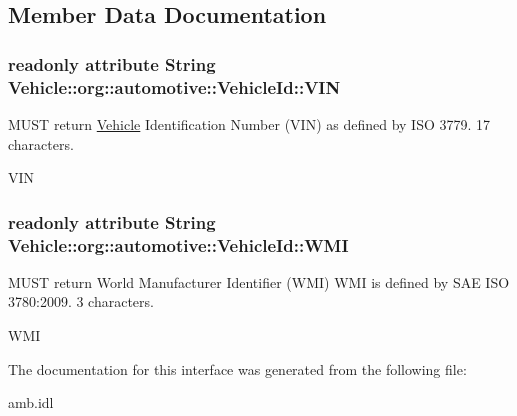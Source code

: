 \subsection{Member Data Documentation}
\hypertarget{interfaceVehicle_1_1org_1_1automotive_1_1VehicleId_a3771c1d174314e5534799d562810fde8}{
\subsubsection[{V\-I\-N}]{\setlength{\rightskip}{0pt plus 5cm}readonly attribute String Vehicle\-::org\-::automotive\-::\-Vehicle\-Id\-::\-V\-I\-N}}\label{interfaceVehicle_1_1org_1_1automotive_1_1VehicleId_a3771c1d174314e5534799d562810fde8}


M\-U\-S\-T return \hyperlink{namespaceVehicle}{Vehicle} Identification Number (V\-I\-N) as defined by I\-S\-O 3779. 17 characters. 

V\-I\-N \hypertarget{interfaceVehicle_1_1org_1_1automotive_1_1VehicleId_a0c6509eca8b31e2c2244f83c038debfb}{
\subsubsection[{W\-M\-I}]{\setlength{\rightskip}{0pt plus 5cm}readonly attribute String Vehicle\-::org\-::automotive\-::\-Vehicle\-Id\-::\-W\-M\-I}}\label{interfaceVehicle_1_1org_1_1automotive_1_1VehicleId_a0c6509eca8b31e2c2244f83c038debfb}


M\-U\-S\-T return World Manufacturer Identifier (W\-M\-I) W\-M\-I is defined by S\-A\-E I\-S\-O 3780\-:2009. 3 characters. 

W\-M\-I 

The documentation for this interface was generated from the following file\-:\begin{DoxyCompactItemize}
\item 
amb.\-idl\end{DoxyCompactItemize}
